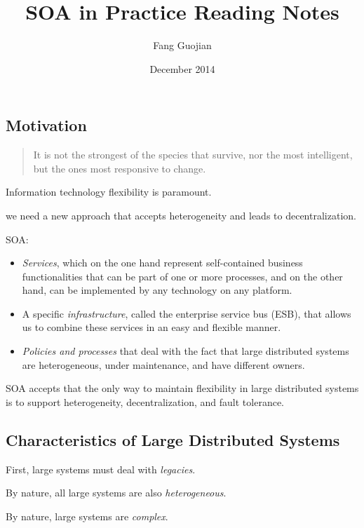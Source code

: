 \documentclass[11pt]{report}
\begin{document}
\title{SOA in Practice Reading Notes}
\author{Fang Guojian}
\date{December 2014}
\maketitle

\chapter{}
\section*{Motivation}
\begin{quote}
It is not the strongest of the species that survive, nor the most intelligent, but the ones most responsive to change.
\end{quote}

Information technology flexibility is paramount.

we need a new approach that accepts heterogeneity and leads to decentralization.

SOA:
\begin{itemize}
     \item \textit{Services}, which on the one hand represent self-contained business functionalities that can be part of one or more processes, and on the other hand, can be implemented by any technology on any platform.
     \item A specific \textit{infrastructure}, called the enterprise service bus (ESB), that allows us to combine these services in an easy and flexible manner.
     \item \textit{Policies and processes} that deal with the fact that large distributed systems are heterogeneous, under maintenance, and have different owners.
\end{itemize}

SOA accepts that the only way to maintain flexibility in large distributed systems is to support heterogeneity, decentralization, and fault tolerance.

\section{Characteristics of Large Distributed Systems}
First, large systems must deal with \textit{legacies}.

By nature, all large systems are also \textit{heterogeneous}.

By nature, large systems are \textit{complex}.
\end{document}

